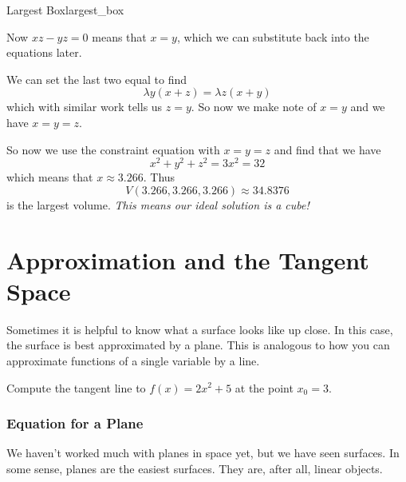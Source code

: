 \begin{ex}{Largest Box}{largest_box}
\begin{enumerate}
            Now $xz-yz=0$ means that $x=y$, which we can substitute back into the equations later. 
            
            We can set the last two equal to find
            \[
            \lambda y (x+z)=\lambda z(x+y)
            \]
            which with similar work tells us $z=y$.  So now we make note of $x=y$ and we have $x=y=z$.  
            
            So now we use the constraint equation with $x=y=z$ and find that we have
            \[
            x^2+y^2+z^2 = 3x^2 = 32
            \]
            which means that $x\approx 3.266$.  Thus
            \[
            V(3.266,3.266,3.266)\approx 34.8376
            \]
            is the largest volume.  \emph{This means our ideal solution is a cube!} 
            
        \end{enumerate}
        \end{ex}
        
        \section{Approximation and the Tangent Space}
        Sometimes it is helpful to know what a surface looks like up close.  In this case, the surface is best approximated by a plane.  This is analogous to how you can approximate functions of a single variable by a line.
        
        \begin{exercise}
        Compute the tangent line to $f(x)=2x^2+5$ at the point $x_0=3$.
        \end{exercise}
        
        \subsubsection{Equation for a Plane}
        
        We haven't worked much with planes in space yet, but we have seen surfaces.  In some sense, planes are the easiest surfaces.  They are, after all, linear objects.
        
